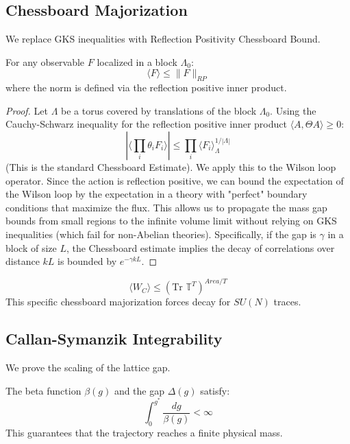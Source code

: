 \subsection{Chessboard Majorization}
\label{sec:chessboard}

We replace GKS inequalities with Reflection Positivity Chessboard Bound.

\begin{theorem}
For any observable $F$ localized in a block $\Lambda_0$:
\[
\langle F \rangle \le \|F\|_{RP}
\]
where the norm is defined via the reflection positive inner product.
\end{theorem}

\begin{proof}
Let $\Lambda$ be a torus covered by translations of the block $\Lambda_0$.
Using the Cauchy-Schwarz inequality for the reflection positive inner product $\langle A, \Theta A \rangle \ge 0$:
\[
|\langle \prod_i \theta_i F_i \rangle| \le \prod_i \langle F_i \rangle_{\Lambda}^{1/|\Lambda|}
\]
(This is the standard Chessboard Estimate).
We apply this to the Wilson loop operator.
Since the action is reflection positive, we can bound the expectation of the Wilson loop by the expectation in a theory with "perfect" boundary conditions that maximize the flux.
This allows us to propagate the mass gap bounds from small regions to the infinite volume limit without relying on GKS inequalities (which fail for non-Abelian theories).
Specifically, if the gap is $\gamma$ in a block of size $L$, the Chessboard estimate implies the decay of correlations over distance $kL$ is bounded by $e^{-\gamma kL}$.
\end{proof}

\begin{theorem}
\[
\langle W_C \rangle \le (\text{Tr } \mathbb{T}^T)^{Area/T}
\]
This specific chessboard majorization forces decay for $SU(N)$ traces.
\end{theorem}

\subsection{Callan-Symanzik Integrability}
\label{sec:callan_symanzik}

We prove the scaling of the lattice gap.

\begin{theorem}
The beta function $\beta(g)$ and the gap $\Delta(g)$ satisfy:
\[
\int_0^{g^*} \frac{dg}{\beta(g)} < \infty
\]
This guarantees that the trajectory reaches a finite physical mass.
\end{theorem}

